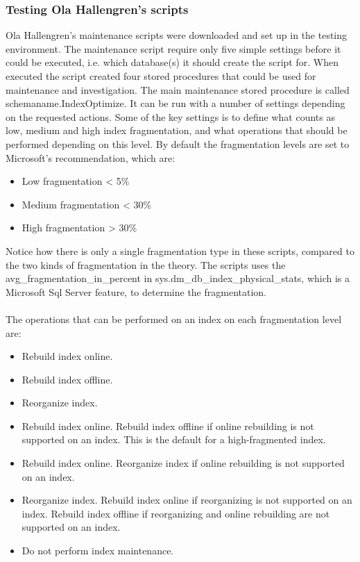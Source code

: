 \documentclass{cslthse-msc}
\begin{document}
\subsubsection{Testing Ola Hallengren's scripts}
Ola Hallengren's maintenance scripts \cite{Hallengren15} were downloaded and set up in the testing environment. The maintenance script require only five simple settings before it could be executed, i.e. which database(s) it should create the script for. When executed the script created four stored procedures that could be used for maintenance and investigation. The main maintenance stored procedure is called schemaname.IndexOptimize. It can be run with a number of settings depending on the requested actions. Some of the key settings is to define what counts as low, medium and high index fragmentation, and what operations that should be performed depending on this level. By default the fragmentation levels are set to Microsoft's recommendation, which are:
\begin{itemize}
\item Low fragmentation < 5\%
\item Medium fragmentation < 30\%
\item High fragmentation > 30\%
\end{itemize}
Notice how there is only a single fragmentation type in these scripts, compared to the two kinds of fragmentation in the theory. The scripts uses the avg\_fragmentation\_in\_percent in sys.dm\_db\_index\_physical\_stats, which is a Microsoft Sql Server feature, to determine the fragmentation.\\\\
The operations that can be performed on an index on each fragmentation level are:
\begin{itemize}
\item Rebuild index online.
\item Rebuild index offline.
\item Reorganize index.
\item Rebuild index online. Rebuild index offline if online rebuilding is not supported on an index. This is the default for a high-fragmented index.
\item Rebuild index online. Reorganize index if online rebuilding is not supported on an index.
\item  Reorganize index. Rebuild index online if reorganizing is not supported on an index. Rebuild index offline if reorganizing and online rebuilding are not supported on an index. 
\item Do not perform index maintenance.
\end{itemize}
\end{document}
